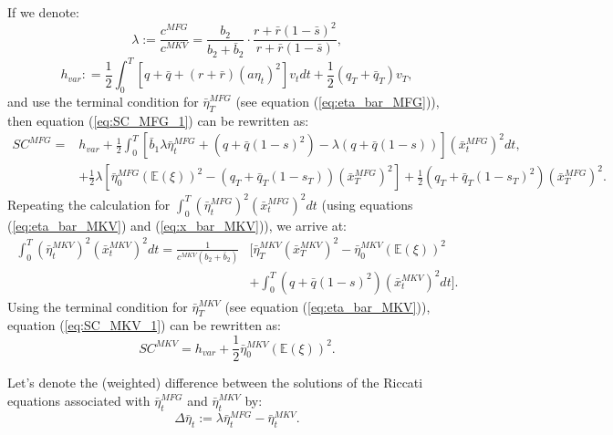 \documentclass[11pt]{article}
\begin{document}
If we denote:
\begin{equation}
\lambda := \frac{c^{MFG}}{c^{MKV}} = \frac{b_2}{b_2 + \bar{b}_2}\cdot \frac{ r + \bar{r}(1-\bar{s})^2 }{r + \bar{r}(1-\bar{s})},
\label{eq:lambda}
\end{equation}
\begin{equation*}
h_{var}: = \frac{1}{2}\int_0^T \left[q+\bar{q}+(r+\bar{r})(a\eta_t)^2\right]v_tdt + \frac{1}{2}(q_T+\bar{q}_T)v_T,
\end{equation*}
and use the terminal condition for $\bar{\eta}^{MFG}_T$ (see equation (\ref{eq:eta_bar_MFG})), then equation (\ref{eq:SC_MFG_1}) can be rewritten as:
\begin{equation}
\begin{split}
SC^{MFG} = & h_{var} +  \frac{1}{2} \int_0^T \left[ \bar{b}_1 \lambda \bar{\eta}_t^{MFG} + (q+ \bar{q}(1-s)^2) - \lambda (q + \bar{q}(1-s)) \right] (\bar{x}_t^{MFG})^2 dt, \\
& + \frac{1}{2} \lambda \left[ \bar{\eta}^{MFG}_0 (\mathbb{E}(\xi))^2 - (q_T+\bar{q}_T(1-s_T)) (\bar{x}_T^{MFG})^2 \right] + \frac{1}{2} (q_T+\bar{q}_T(1-s_T)^2)(\bar{x}_T^{MFG})^2.
\end{split}
\label{eq:SC_MFG_2}
\end{equation}
Repeating the calculation for $\int_0^T (\bar{\eta}^{MFG}_t)^2 (\bar{x}^{MFG}_t)^2 dt$ (using equations (\ref{eq:eta_bar_MKV}) and (\ref{eq:x_bar_MKV})), we arrive at:
\begin{equation*}
\begin{split}
\int_0^T (\bar{\eta}^{MKV}_t)^2 (\bar{x}^{MKV}_t)^2 dt=\frac{1}{c^{MKV}(b_2 + \bar{b}_2)} &\Bigg[ \bar{\eta}^{MKV}_T (\bar{x}^{MKV}_T)^2 - \bar{\eta}^{MKV}_0 (\mathbb{E}(\xi))^2 \\
&+ \int_0^T (q+\bar{q}(1-s)^2) (\bar{x}^{MKV}_t)^2 dt \Bigg].
\end{split}
\end{equation*}
Using the terminal condition for $\bar{\eta}^{MKV}_T$ (see equation (\ref{eq:eta_bar_MKV})), equation (\ref{eq:SC_MKV_1}) can be rewritten as:
\begin{equation}
SC^{MKV} = h_{var} + \frac{1}{2} \bar{\eta}^{MKV}_0 (\mathbb{E}(\xi))^2.
\label{eq:SC_MKV_2}
\end{equation}

Let's denote the (weighted) difference between the solutions of the Riccati equations associated with $\bar{\eta}_t^{MFG}$ and $\bar{\eta}_t^{MKV}$ by:
\begin{equation}
	\Delta \bar{\eta}_t := \lambda \bar{\eta}_t^{MFG} - \bar{\eta}_t^{MKV} .
\label{eq:delta_eta}
\end{equation} 
\end{document}
